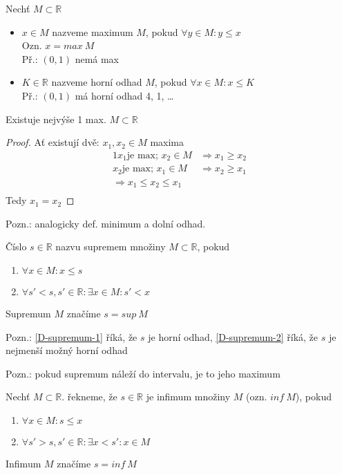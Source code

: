 \begin{definition}[Maximum]
	Nechť $M\subset\mathbb{R}$
	\begin{itemize}
		\item $x\in M$ nazveme maximum $M$, pokud $\forall y\in M: y\leq x$ \\
			Ozn. $x=max~M$ \\
			Př.: $(0,1)$ nemá max
		\item $K\in\mathbb{R}$ nazveme horní odhad $M$, pokud $\forall x\in M: x\leq K$ \\
			Př.: $(0,1)$ má horní odhad 4, 1, \dots
	\end{itemize}
\end{definition}

\begin{lemma}
	Existuje nejvýše 1 max. $M\subset\mathbb{R}$
\end{lemma}
\begin{proof}
	Ať existují dvě: $x_1, x_2\in M$ maxima
	\begin{alignat}{1}
		x_1 \text{je max; }x_2\in M &\Rightarrow x_1\geq x_2 \\
		x_2 \text{je max; }x_1\in M &\Rightarrow x_2\geq x_1 \\
		\Rightarrow x_1\leq x_2\leq x_1 \\
	\end{alignat}
	Tedy $x_1=x_2$
\end{proof}

Pozn.: analogicky def. minimum a dolní odhad.

\begin{definition}[Supremum]
	Číslo $s\in\mathbb{R}$ nazvu supremem množiny $M\subset\mathbb{R}$, pokud
	\begin{enumerate}[I]
		\item\label{D-supremum-1} $\forall x\in M: x\leq s$
		\item\label{D-supremum-2} $\forall s'<s, s'\in\mathbb{R}: \exists x\in M: s'<x$
	\end{enumerate}
	Supremum $M$ značíme $s=sup~M$
\end{definition}

Pozn.: \ref{D-supremum-1} říká, že $s$ je horní odhad, \ref{D-supremum-2} říká,
že $s$ je nejmenší možný horní odhad

Pozn.: pokud supremum náleží do intervalu, je to jeho maximum

\begin{definition}[Infimum]
	Nechť $M\subset\mathbb{R}$. řekneme, že $s\in\mathbb{R}$ je infimum množiny $M$
	(ozn. $inf~M$), pokud
	\begin{enumerate}[I]
		\item\label{D-infimum-1} $\forall x\in M: s\leq x$
		\item\label{D-infimum-2} $\forall s'>s, s'\in\mathbb{R}: \exists x<s': x\in M$
	\end{enumerate}
	Infimum $M$ značíme $s=inf~M$
\end{definition}


